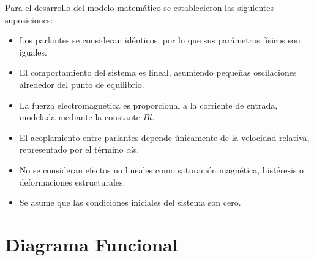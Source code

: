 \documentclass[journal]{IEEEtran}
\begin{document}

Para el desarrollo del modelo matemático se establecieron las siguientes suposiciones:

\begin{itemize}
    \item Los parlantes se consideran idénticos, por lo que sus parámetros físicos son iguales.
    
    \item El comportamiento del sistema es lineal, asumiendo pequeñas oscilaciones alrededor del punto de equilibrio.
    
    \item La fuerza electromagnética es proporcional a la corriente de entrada, modelada mediante la constante $Bl$.
    
    \item El acoplamiento entre parlantes depende únicamente de la velocidad relativa, representado por el término $\alpha \dot{x}$.
    
    \item No se consideran efectos no lineales como saturación magnética, histéresis o deformaciones estructurales.
    
    \item Se asume que las condiciones iniciales del sistema son cero.
\end{itemize}

\section{Diagrama Funcional}


\end{document}
